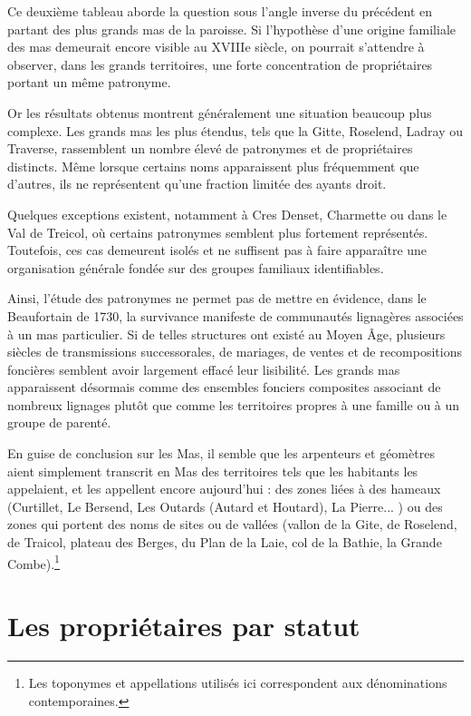 \documentclass[12pt,a4paper]{report}
\begin{document}
Ce deuxième tableau  aborde la question sous l'angle inverse du précédent en partant des plus grands mas de la paroisse. Si l'hypothèse d'une origine familiale des mas demeurait encore visible au XVIIIe siècle, on pourrait s'attendre à observer, dans les grands territoires, une forte concentration de propriétaires portant un même patronyme.

Or les résultats obtenus montrent généralement une situation beaucoup plus complexe. Les grands mas les plus étendus, tels que la Gitte, Roselend, Ladray ou Traverse, rassemblent un nombre élevé de patronymes et de propriétaires distincts. Même lorsque certains noms apparaissent plus fréquemment que d'autres, ils ne représentent qu'une fraction limitée des ayants droit.

Quelques exceptions existent, notamment à Cres Denset, Charmette ou dans le Val de Treicol, où certains patronymes semblent plus fortement représentés. Toutefois, ces cas demeurent isolés et ne suffisent pas à faire apparaître une organisation générale fondée sur des groupes familiaux identifiables.

Ainsi, l'étude des patronymes ne permet pas de mettre en évidence, dans le Beaufortain de 1730, la survivance manifeste de communautés lignagères associées à un mas particulier. Si de telles structures ont existé au Moyen Âge, plusieurs siècles de transmissions successorales, de mariages, de ventes et de recompositions foncières semblent avoir largement effacé leur lisibilité. Les grands mas apparaissent désormais comme des ensembles fonciers composites associant de nombreux lignages plutôt que comme les territoires propres à une famille ou à un groupe de parenté.

En guise de conclusion sur les Mas, il semble que les arpenteurs et géomètres aient simplement transcrit en Mas des territoires tels que les habitants les appelaient, et les appellent encore aujourd'hui : des zones liées à des hameaux (Curtillet, Le Bersend, Les Outards (Autard et Houtard), La Pierre... ) ou des zones qui portent des noms de sites ou de vallées (vallon de la Gite, de Roselend, de Traicol, plateau des Berges, du Plan de la Laie, col de la Bathie, la Grande Combe).\footnote{Les toponymes et appellations utilisés ici correspondent aux dénominations contemporaines.}

\section{Les propriétaires par statut}
\end{document}
